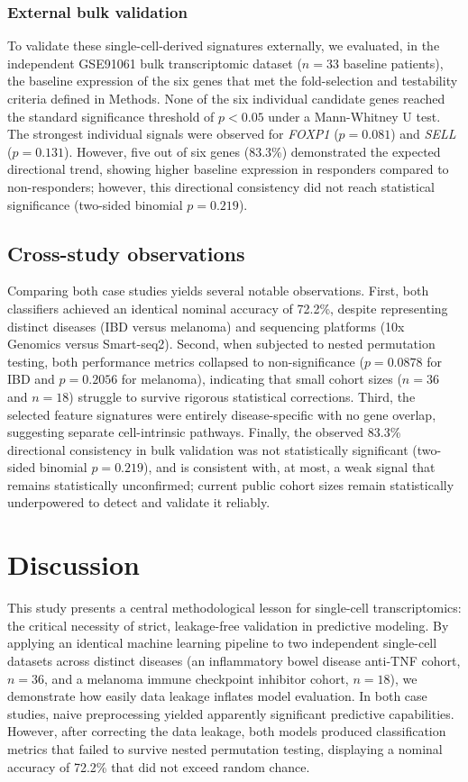 \documentclass{bmcart}
\begin{document}
\subsubsection*{External bulk validation}
To validate these single-cell-derived signatures externally, we evaluated, in the independent GSE91061 bulk transcriptomic dataset \cite{riaz} ($n=33$ baseline patients), the baseline expression of the six genes that met the fold-selection and testability criteria defined in Methods. None of the six individual candidate genes reached the standard significance threshold of $p < 0.05$ under a Mann-Whitney U test. The strongest individual signals were observed for \textit{FOXP1} ($p = 0.081$) and \textit{SELL} ($p = 0.131$). However, five out of six genes (83.3\%) demonstrated the expected directional trend, showing higher baseline expression in responders compared to non-responders; however, this directional consistency did not reach statistical significance (two-sided binomial $p = 0.219$).

\subsection*{Cross-study observations}
Comparing both case studies yields several notable observations. First, both classifiers achieved an identical nominal accuracy of 72.2\%, despite representing distinct diseases (IBD versus melanoma) and sequencing platforms (10x Genomics versus Smart-seq2). Second, when subjected to nested permutation testing, both performance metrics collapsed to non-significance ($p = 0.0878$ for IBD and $p = 0.2056$ for melanoma), indicating that small cohort sizes ($n=36$ and $n=18$) struggle to survive rigorous statistical corrections. Third, the selected feature signatures were entirely disease-specific with no gene overlap, suggesting separate cell-intrinsic pathways. Finally, the observed 83.3\% directional consistency in bulk validation was not statistically significant (two-sided binomial $p = 0.219$), and is consistent with, at most, a weak signal that remains statistically unconfirmed; current public cohort sizes remain statistically underpowered to detect and validate it reliably.

\section*{Discussion}
This study presents a central methodological lesson for single-cell transcriptomics: the critical necessity of strict, leakage-free validation in predictive modeling. By applying an identical machine learning pipeline to two independent single-cell datasets across distinct diseases (an inflammatory bowel disease anti-TNF cohort, $n=36$, and a melanoma immune checkpoint inhibitor cohort, $n=18$), we demonstrate how easily data leakage inflates model evaluation. In both case studies, naive preprocessing yielded apparently significant predictive capabilities. However, after correcting the data leakage, both models produced classification metrics that failed to survive nested permutation testing, displaying a nominal accuracy of 72.2\% that did not exceed random chance.
\end{document}
